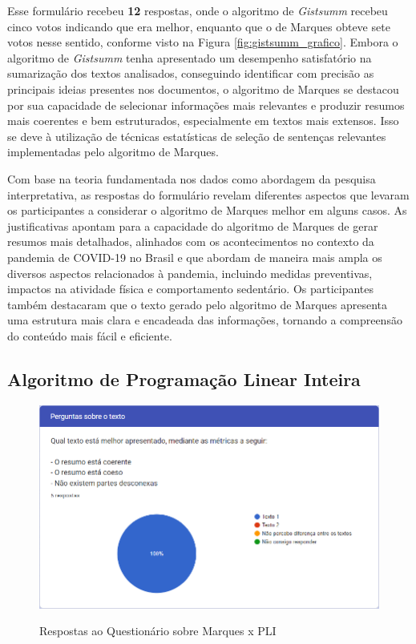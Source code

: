 Esse formulário recebeu \textbf{12} respostas, onde o algoritmo de \textit{Gistsumm} recebeu cinco votos indicando que era melhor, enquanto que o de Marques obteve sete votos nesse sentido, conforme visto na Figura \ref{fig:gistsumm_grafico}. Embora o algoritmo de \textit{Gistsumm} tenha apresentado um desempenho satisfatório na sumarização dos textos analisados, conseguindo identificar com precisão as principais ideias presentes nos documentos, o algoritmo de Marques se destacou por sua capacidade de selecionar informações mais relevantes e produzir resumos mais coerentes e bem estruturados, especialmente em textos mais extensos. Isso se deve à utilização de técnicas estatísticas de seleção de sentenças relevantes implementadas pelo algoritmo de Marques.

Com base na teoria fundamentada nos dados como abordagem da pesquisa interpretativa, as respostas do formulário revelam diferentes aspectos que levaram os participantes a considerar o algoritmo de Marques melhor em alguns casos. As justificativas apontam para a capacidade do algoritmo de Marques de gerar resumos mais detalhados, alinhados com os acontecimentos no contexto da pandemia de COVID-19 no Brasil e que abordam de maneira mais ampla os diversos aspectos relacionados à pandemia, incluindo medidas preventivas, impactos na atividade física e comportamento sedentário. Os participantes também destacaram que o texto gerado pelo algoritmo de Marques apresenta uma estrutura mais clara e encadeada das informações, tornando a compreensão do conteúdo mais fácil e eficiente.

\subsection{Algoritmo de Programação Linear Inteira}
\label{chap:pli}

\begin{figure}[!h]
    \centering
    \caption{Respostas ao Questionário sobre Marques x PLI}
    \includegraphics[width=\textwidth]{figuras/graficos/pli.png}
    \label{fig:pli_grafico}
\end{figure}

